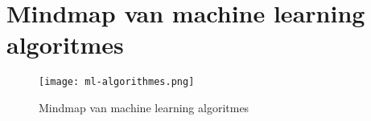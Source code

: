 \section{Mindmap van machine learning algoritmes}\label{appendix:ml-mindmap}

\begin{figure}[hbt!]
  \begin{sideways}
   \begin{minipage}{1.25\textwidth}
    \texttt{[image: ml-algorithmes.png]}
   \end{minipage}
  \end{sideways}
  \centering
  \caption{Mindmap van machine learning algoritmes}
  \label{fig:ai-ml-nn-dl}
 \end{figure}


\newpage